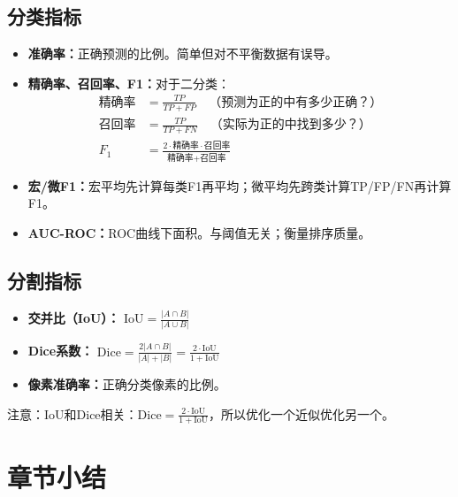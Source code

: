 \subsection{分类指标}

\begin{itemize}
    \item \textbf{准确率：}正确预测的比例。简单但对不平衡数据有误导。
    \item \textbf{精确率、召回率、F1：}对于二分类：
    \begin{align}
    \text{精确率} &= \frac{TP}{TP + FP} \quad \text{（预测为正的中有多少正确？）} \\
    \text{召回率} &= \frac{TP}{TP + FN} \quad \text{（实际为正的中找到多少？）} \\
    F_1 &= \frac{2 \cdot \text{精确率} \cdot \text{召回率}}{\text{精确率} + \text{召回率}}
    \end{align}
    \item \textbf{宏/微F1：}宏平均先计算每类F1再平均；微平均先跨类计算TP/FP/FN再计算F1。
    \item \textbf{AUC-ROC：}ROC曲线下面积。与阈值无关；衡量排序质量。
\end{itemize}

\subsection{分割指标}

\begin{itemize}
    \item \textbf{交并比（IoU）：} $\text{IoU} = \frac{|A \cap B|}{|A \cup B|}$
    \item \textbf{Dice系数：} $\text{Dice} = \frac{2|A \cap B|}{|A| + |B|} = \frac{2 \cdot \text{IoU}}{1 + \text{IoU}}$
    \item \textbf{像素准确率：}正确分类像素的比例。
\end{itemize}

注意：IoU和Dice相关：$\text{Dice} = \frac{2 \cdot \text{IoU}}{1 + \text{IoU}}$，所以优化一个近似优化另一个。

\section{章节小结}

